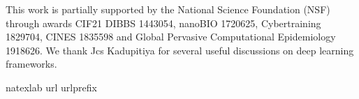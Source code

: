 \documentclass[12pt]{article}
\theoremstyle{definition}
\renewcommand{\_}{%
    \textunderscore\hspace{0pt}%
}
\begin{document}

%
%



\vskip 14pt

This work is partially supported by the National Science Foundation (NSF) through awards CIF21 DIBBS 1443054, nanoBIO 1720625, Cybertraining 1829704, CINES 1835598 and Global Pervasive Computational Epidemiology 1918626.  We thank Jcs Kadupitiya for several useful discussions on deep learning frameworks.
\par



%
%


\fontsize{11}{1em}\selectfont
\renewcommand\bibname{\bfseries{\fontsize{14pt}{1em}\selectfont References}}
\expandafter\ifx\csname
natexlab\endcsname\relax\def\natexlab#1{#1}\fi
\expandafter\ifx\csname url\endcsname\relax
  \def\url#1{\texttt{#1}}\fi
\expandafter\ifx\csname urlprefix\endcsname\relax\def\urlprefix{URL}\fi



%


\end{document}
